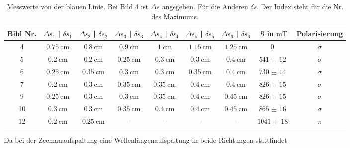 \documentclass[
  bibliography=totoc,     %
  captions=tableheading,  %
  titlepage=firstiscover, %
]{scrartcl}
\begin{document}
\begin{landscape}
  \begin{table}[H]
    \centering
    \caption{Messwerte von der blauen Linie. Bei Bild 4 ist $\Delta s$ angegeben. Für die Anderen $\delta s$. Der Index steht für die Nr. des Maximums.}
    \label{tab:aufspaltungswerte2}
    \begin{tabular}{c c c c c c c c c}
      \toprule
      Bild Nr. & $\Delta s_1$ | $\delta s_1$ & $\Delta s_2$ | $\delta s_2$ & $\Delta s_3$ | $\delta s_3$ & $\Delta s_4$ | $\delta s_4$ & $\Delta s_5$ | $\delta s_5$ & $\Delta s_6$ | $\delta s_6$ & $B$ in $\si{\milli\tesla}$ & Polarisierung \\
      \midrule
       4 & $\SI{0.75}{\centi\meter}$ & $\SI{0.8 }{\centi\meter}$ & $\SI{0.9 }{\centi\meter}$ & $\SI{1   }{\centi\meter}$ & $\SI{1.15}{\centi\meter}$ & $\SI{1.25}{\centi\meter}$ & $\SI{0}{}$ & $\sigma$ \\
       5 & $\SI{0.2 }{\centi\meter}$ & $\SI{0.2 }{\centi\meter}$ & $\SI{0.25}{\centi\meter}$ & $\SI{0.3 }{\centi\meter}$ & $\SI{0.3 }{\centi\meter}$ & $\SI{0.4 }{\centi\meter}$ & $\SI{541(12)}{}$ & $\sigma$ \\
       6 & $\SI{0.25}{\centi\meter}$ & $\SI{0.35}{\centi\meter}$ & $\SI{0.3 }{\centi\meter}$ & $\SI{0.3 }{\centi\meter}$ & $\SI{0.35}{\centi\meter}$ & $\SI{0.4 }{\centi\meter}$ & $\SI{730(14)}{}$ & $\sigma$ \\
       7 & $\SI{0.2 }{\centi\meter}$ & $\SI{0.3 }{\centi\meter}$ & $\SI{0.35}{\centi\meter}$ & $\SI{0.35}{\centi\meter}$ & $\SI{0.4 }{\centi\meter}$ & $\SI{0.4 }{\centi\meter}$ & $\SI{826(15)}{}$ & $\sigma$ \\
       9 & $\SI{0.25}{\centi\meter}$ & $\SI{0.3 }{\centi\meter}$ & $\SI{0.3 }{\centi\meter}$ & $\SI{0.35}{\centi\meter}$ & $\SI{0.4 }{\centi\meter}$ & $\SI{0.45}{\centi\meter}$ & $\SI{826(15)}{}$ & $\sigma$ \\
      10 & $\SI{0.3 }{\centi\meter}$ & $\SI{0.3 }{\centi\meter}$ & $\SI{0.35}{\centi\meter}$ & $\SI{0.4 }{\centi\meter}$ & $\SI{0.4 }{\centi\meter}$ & $\SI{0.45}{\centi\meter}$ & $\SI{865(16)}{}$ & $\sigma$ \\
      12 & $\SI{0.2 }{\centi\meter}$ & $\SI{0.25}{\centi\meter}$ & - & - & - & - & $\SI{1041(18)}{}$ & $\pi$ \\
      \bottomrule
    \end{tabular}
  \end{table}
\end{landscape}
\clearpage
\noindent
Da bei der Zeemanaufspaltung eine Wellenlängenaufspaltung in beide Richtungen stattfindet
\end{document}
